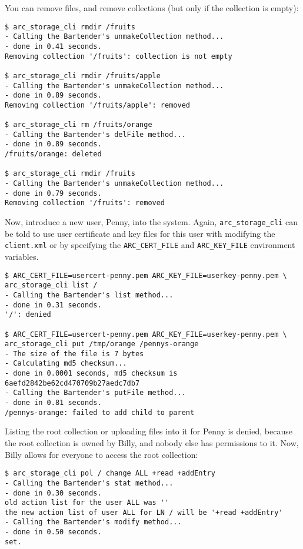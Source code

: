 \documentclass{article}
\begin{document}
You can remove files, and remove collections (but only if the collection is empty):

\begin{verbatim}
$ arc_storage_cli rmdir /fruits
- Calling the Bartender's unmakeCollection method...
- done in 0.41 seconds.
Removing collection '/fruits': collection is not empty

$ arc_storage_cli rmdir /fruits/apple
- Calling the Bartender's unmakeCollection method...
- done in 0.89 seconds.
Removing collection '/fruits/apple': removed

$ arc_storage_cli rm /fruits/orange
- Calling the Bartender's delFile method...
- done in 0.89 seconds.
/fruits/orange: deleted

$ arc_storage_cli rmdir /fruits
- Calling the Bartender's unmakeCollection method...
- done in 0.79 seconds.
Removing collection '/fruits': removed
\end{verbatim}

Now, introduce a new user, Penny, into the system. Again, \verb!arc_storage_cli! can be told to use user certificate and key files for this user with modifying the \verb!client.xml! or by specifying the \verb!ARC_CERT_FILE! and \verb!ARC_KEY_FILE! environment variables.

\begin{verbatim}
$ ARC_CERT_FILE=usercert-penny.pem ARC_KEY_FILE=userkey-penny.pem \
arc_storage_cli list /
- Calling the Bartender's list method...
- done in 0.31 seconds.
'/': denied

$ ARC_CERT_FILE=usercert-penny.pem ARC_KEY_FILE=userkey-penny.pem \
arc_storage_cli put /tmp/orange /pennys-orange
- The size of the file is 7 bytes
- Calculating md5 checksum...
- done in 0.0001 seconds, md5 checksum is 6aefd2842be62cd470709b27aedc7db7
- Calling the Bartender's putFile method...
- done in 0.81 seconds.
/pennys-orange: failed to add child to parent

\end{verbatim}

Listing the root collection or uploading files into it for Penny is denied, because the root collection is owned by Billy, and nobody else has permissions to it. Now, Billy allows for everyone to access the root collection:

\begin{verbatim}
$ arc_storage_cli pol / change ALL +read +addEntry
- Calling the Bartender's stat method...
- done in 0.30 seconds.
old action list for the user ALL was ''
the new action list of user ALL for LN / will be '+read +addEntry'
- Calling the Bartender's modify method...
- done in 0.50 seconds.
set.
\end{verbatim}
\end{document}
